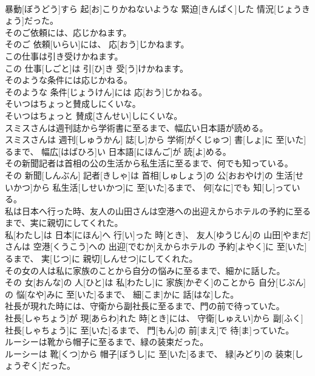 \documentclass[8pt]{extreport}
\begin{document}
\begin{CJK}{UTF8}{min}
\\	暴動[ぼうどう]すら 起[お]こりかねないような 緊迫[きんぱく]した 情況[じょうきょう]だった。
\\	そのご依頼には、応じかねます。	
\\	そのご 依頼[いらい]には、 応[おう]じかねます。
\\	この仕事は引き受けかねます。	
\\	この 仕事[しごと]は 引[ひ]き 受[う]けかねます。
\\	そのような条件には応じかねる。	
\\	そのような 条件[じょうけん]には 応[おう]じかねる。
\\	そいつはちょっと賛成しにくいな。	
\\	そいつはちょっと 賛成[さんせい]しにくいな。
\\	スミスさんは週刊誌から学術書に至るまで、幅広い日本語が読める。	
\\	スミスさんは 週刊[しゅうかん] 誌[し]から 学術[がくじゅつ] 書[しょ]に 至[いた]るまで、 幅広[はばひろ]い 日本語[にほんご]が 読[よ]める。
\\	その新聞記者は首相の公の生活から私生活に至るまで、何でも知っている。	
\\	その 新聞[しんぶん] 記者[きしゃ]は 首相[しゅしょう]の 公[おおやけ]の 生活[せいかつ]から 私生活[しせいかつ]に 至[いた]るまで、 何[なに]でも 知[し]っている。
\\	私は日本へ行った時、友人の山田さんは空港への出迎えからホテルの予約に至るまで、実に親切にしてくれた。	
\\	私[わたし]は 日本[にほん]へ 行[い]った 時[とき]、 友人[ゆうじん]の 山田[やまだ]さんは 空港[くうこう]への 出迎[でむか]えからホテルの 予約[よやく]に 至[いた]るまで、 実[じつ]に 親切[しんせつ]にしてくれた。
\\	その女の人は私に家族のことから自分の悩みに至るまで、細かに話した。	
\\	その 女[おんな]の 人[ひと]は 私[わたし]に 家族[かぞく]のことから 自分[じぶん]の 悩[なや]みに 至[いた]るまで、 細[こま]かに 話[はな]した。
\\	社長が現れた時には、守衛から副社長に至るまで、門の前で待っていた。	
\\	社長[しゃちょう]が 現[あらわ]れた 時[とき]には、 守衛[しゅえい]から 副[ふく] 社長[しゃちょう]に 至[いた]るまで、 門[もん]の 前[まえ]で 待[ま]っていた。
\\	ルーシーは靴から帽子に至るまで、緑の装束だった。	
\\	ルーシーは 靴[くつ]から 帽子[ぼうし]に 至[いた]るまで、 緑[みどり]の 装束[しょうぞく]だった。

\end{CJK}
\end{document}
